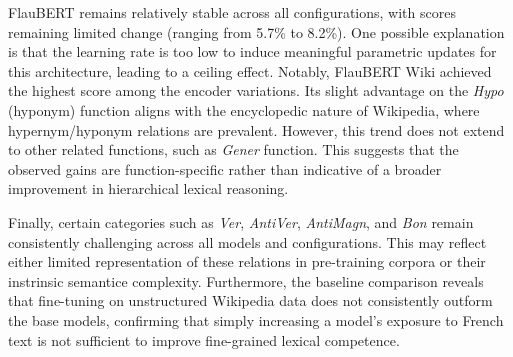 \documentclass[11pt]{article}
\begin{document}
FlauBERT remains relatively stable across all configurations, with scores remaining limited change (ranging from 5.7\% to 8.2\%). One possible explanation is that the learning rate is too low to induce meaningful parametric updates for this architecture, leading to a ceiling effect. Notably, FlauBERT Wiki achieved the highest score among the encoder variations. Its slight advantage on the \textit{Hypo} (hyponym) function aligns with the encyclopedic nature of Wikipedia, where hypernym/hyponym relations are prevalent. However, this trend does not extend to other related functions, such as \textit{Gener} function. This suggests that the observed gains are function-specific rather than indicative of a broader improvement in hierarchical lexical reasoning.

Finally, certain categories such as \textit{Ver}, \textit{AntiVer}, \textit{AntiMagn}, and \textit{Bon} remain consistently challenging across all models and configurations. This may reflect either limited representation of these relations in pre-training corpora or their instrinsic semantice complexity. Furthermore, the baseline comparison reveals that fine-tuning on unstructured Wikipedia data does not consistently outform the base models, confirming that simply increasing a model's exposure to French text is not sufficient to improve fine-grained lexical competence.
\end{document}
